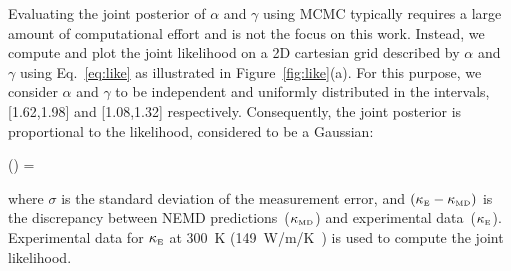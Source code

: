Evaluating the joint posterior of $\alpha$ and $\gamma$ using MCMC typically requires a large amount of
computational effort and is not the focus on this work. Instead, we compute and plot the joint likelihood on
a 2D cartesian grid described by $\alpha$ and $\gamma$ using Eq.~\ref{eq:like} as illustrated in
Figure~\ref{fig:like}(a). For this purpose, we consider $\alpha$ and $\gamma$ to be
independent and uniformly distributed in the intervals, [1.62,1.98] and [1.08,1.32] respectively. 
Consequently, the joint posterior is proportional to the likelihood, considered to be a Gaussian:

\be
{}(\vert{}) = \exp{}
\label{eq:like}
\ee

\noindent where $\sigma$ is the standard deviation of the measurement error, and
$(\kappa_{\tiny{\mbox{E}}} - \kappa_{\tiny{\mbox{MD}}})$ is the discrepancy between 
NEMD predictions~($\kappa_{\tiny{\mbox{MD}}}$)
and experimental data~($\kappa_{\tiny{\mbox{E}}}$). Experimental data for $\kappa_{\tiny{\mbox{E}}}$ at 300~K
(149~W/m/K~\cite{Shanks:1963}) is used to compute the joint likelihood. 

